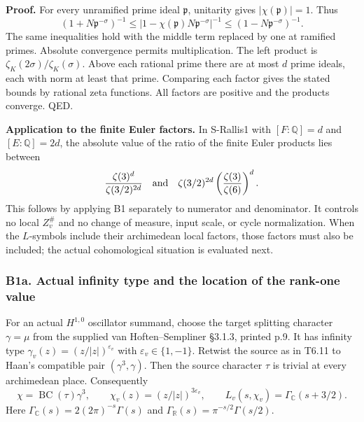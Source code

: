 \documentclass[11pt,a4paper]{article}
\theoremstyle{definition}
\begin{document}
\textbf{Proof.} For every unramified prime ideal \(\mathfrak p\), unitarity gives \(|\chi(\mathfrak p)|=1\). Thus \[
 (1+N\mathfrak p^{-\sigma})^{-1}\leq
 |1-\chi(\mathfrak p)N\mathfrak p^{-\sigma}|^{-1}
 \leq(1-N\mathfrak p^{-\sigma})^{-1}.
\] The same inequalities hold with the middle term replaced by one at ramified primes. Absolute convergence permits multiplication. The left product is \(\zeta_K(2\sigma)/\zeta_K(\sigma)\). Above each rational prime there are at most \(d\) prime ideals, each with norm at least that prime. Comparing each factor gives the stated bounds by rational zeta functions. All factors are positive and the products converge. QED.

\textbf{Application to the finite Euler factors.} In S-Rallis1 with \([F:\mathbb Q]=d\) and \([E:\mathbb Q]=2d\), the absolute value of the ratio of the finite Euler products lies between \[
 \frac{\zeta(3)^d}{\zeta(3/2)^{2d}}
 \quad\hbox{and}\quad
 \zeta(3/2)^{2d}\left(\frac{\zeta(3)}{\zeta(6)}\right)^d.
\] This follows by applying B1 separately to numerator and denominator. It controls no local \(Z_v^\#\) and no change of measure, input scale, or cycle normalization. When the \(L\)-symbols include their archimedean local factors, those factors must also be included; the actual cohomological situation is evaluated next.

\subsubsection{B1a. Actual infinity type and the location of the rank-one value}\label{b1a.-actual-infinity-type-and-the-location-of-the-rank-one-value}

For an actual \(H^{1,0}\) oscillator summand, choose the target splitting character \(\gamma=\mu\) from the supplied van Hoften--Sempliner §3.1.3, printed p.9. It has infinity type \(\gamma_v(z)=(z/|z|)^{\varepsilon_v}\) with \(\varepsilon_v\in\{1,-1\}\). Retwist the source as in T6.11 to Haan's compatible pair \((\gamma^3,\gamma)\). Then the source character \(\tau\) is trivial at every archimedean place. Consequently \[
 \chi=\operatorname{BC}(\tau)\gamma^3,
 \qquad \chi_v(z)=(z/|z|)^{3\varepsilon_v},
 \qquad L_v(s,\chi_v)=\Gamma_{\mathbb C}(s+3/2).
\tag{B1a.1}
\] Here \(\Gamma_{\mathbb C}(s)=2(2\pi)^{-s}\Gamma(s)\) and \(\Gamma_{\mathbb R}(s)=\pi^{-s/2}\Gamma(s/2)\).
\end{document}
